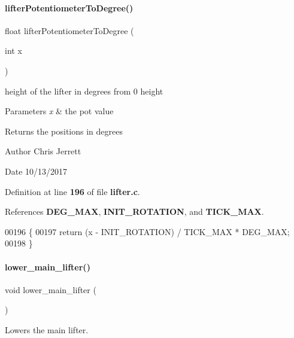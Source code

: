 \paragraph{lifter\+Potentiometer\+To\+Degree()}
{\footnotesize\ttfamily float lifter\+Potentiometer\+To\+Degree (\begin{DoxyParamCaption}\item[{int}]{x }\end{DoxyParamCaption})}



height of the lifter in degrees from 0 height 


\begin{DoxyParams}{Parameters}
{\em x} & the pot value \\
\hline
\end{DoxyParams}
\begin{DoxyReturn}{Returns}
the positions in degrees 
\end{DoxyReturn}
\begin{DoxyAuthor}{Author}
Chris Jerrett 
\end{DoxyAuthor}
\begin{DoxyDate}{Date}
10/13/2017 
\end{DoxyDate}


Definition at line \textbf{ 196} of file \textbf{ lifter.\+c}.



References \textbf{ D\+E\+G\+\_\+\+M\+AX}, \textbf{ I\+N\+I\+T\+\_\+\+R\+O\+T\+A\+T\+I\+ON}, and \textbf{ T\+I\+C\+K\+\_\+\+M\+AX}.


\begin{DoxyCode}
00196                                          \{
00197   \textcolor{keywordflow}{return} (x - INIT_ROTATION) / TICK_MAX * DEG_MAX;
00198 \}
\end{DoxyCode}
\mbox{\label{a00026_ad36c37086a91046af4e6f619618b7719}} 
\paragraph{lower\+\_\+main\+\_\+lifter()}
{\footnotesize\ttfamily void lower\+\_\+main\+\_\+lifter (\begin{DoxyParamCaption}{ }\end{DoxyParamCaption})}



Lowers the main lifter. 

